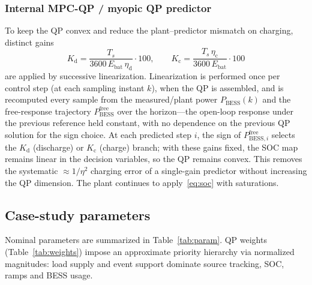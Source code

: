 \documentclass{ieeeaccess}
\begin{document}
\subsubsection{Internal MPC-QP / myopic QP predictor}
To keep the QP convex and reduce the plant--predictor mismatch on charging, distinct gains
\begin{equation}
K_{\mathrm{d}}=\frac{T_s}{3600\,E_{\mathrm{bat}}\,\eta_{\mathrm{d}}}\cdot 100,\qquad
K_{\mathrm{c}}=\frac{T_s\,\eta_{\mathrm{c}}}{3600\,E_{\mathrm{bat}}}\cdot 100
\end{equation}
are applied by successive linearization. Linearization is performed once per control step (at each sampling instant $k$), when the QP is assembled, and is recomputed every sample from the measured/plant power $P_{\mathrm{BESS}}(k)$ and the free-response trajectory $P_{\mathrm{BESS}}^{\mathrm{free}}$ over the horizon---the open-loop response under the previous reference held constant, with no dependence on the previous QP solution for the sign choice. At each predicted step $i$, the sign of $P_{\mathrm{BESS},i}^{\mathrm{free}}$ selects the $K_{\mathrm{d}}$ (discharge) or $K_{\mathrm{c}}$ (charge) branch; with these gains fixed, the SOC map remains linear in the decision variables, so the QP remains convex. This removes the systematic $\approx 1/\eta^2$ charging error of a single-gain predictor without increasing the QP dimension. The plant continues to apply~\eqref{eq:soc} with saturations.

\subsection{Case-study parameters}
Nominal parameters are summarized in Table~\ref{tab:param}. QP weights (Table~\ref{tab:weights}) impose an approximate priority hierarchy via normalized magnitudes: load supply and event support dominate source tracking, SOC, ramps and BESS usage.
\end{document}
